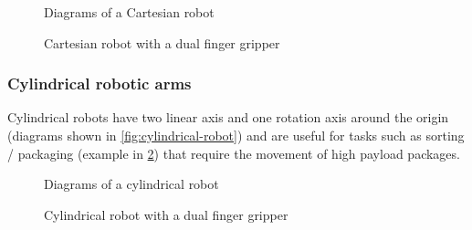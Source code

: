 \begin{figure}[H]
	\begin{floatrow}[2]
		{\caption[Diagrams of a Cartesian robot]{Diagrams of a Cartesian robot\protect\footnotemark}\label{fig:cartesian-robot}}
		{\caption[Cartesian robot with a dual finger gripper]{Cartesian robot with a dual finger gripper\protect\footnotemark}\label{fig:cartesian-robot-festo-3d-gantry}}
	\end{floatrow}
\end{figure}


\subsubsection{Cylindrical robotic arms}

Cylindrical robots have two linear axis and one rotation axis around the origin (diagrams shown in \cref{fig:cylindrical-robot}) and are useful for tasks such as sorting / packaging (example in \cref{fig:cylindrical-robot-plate-crane}) that require the movement of high payload packages.

\begin{figure}[H]
	\begin{floatrow}[2]
		{\caption[Diagrams of a cylindrical robot]{Diagrams of a cylindrical robot\protect\footnotemark}\label{fig:cylindrical-robot}}
		{\caption[Cylindrical robot with a dual finger gripper]{Cylindrical robot with a dual finger gripper\protect\footnotemark}\label{fig:cylindrical-robot-plate-crane}}
	\end{floatrow}
\end{figure}


